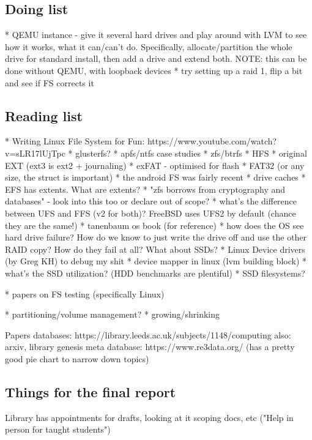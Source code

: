 \documentclass[a4paper]{report}
\begin{document}
    \subsection{Doing list}
        * QEMU instance
            - give it several hard drives and play around with LVM to see how
            it works, what it can/can't do. Specifically, allocate/partition
            the whole drive for standard install, then add a drive and extend
            both. NOTE: this can be done without QEMU, with loopback devices
        * try setting up a raid 1, flip a bit and see if FS corrects it

    \subsection{Reading list}
        * Writing Linux File System for Fun: https://www.youtube.com/watch?v=sLR17lUjTpc
        * glusterfs?
        * apfs/ntfs case studies
        * zfs/btrfs
        * HFS
        * original EXT (ext3 is ext2 + journaling)
        * exFAT - optimised for flash
        * FAT32 (or any size, the struct is important)
        * the android FS was fairly recent
        * drive caches
        * EFS has extents. What are extents?
        * "zfs borrows from cryptography and databases" - look into this too or declare out of scope?
        * what's the difference between UFS and FFS (v2 for both)? FreeBSD uses UFS2 by default (chance they are the same!)
        * tanenbaum os book (for reference)
        * how does the OS see hard drive failure? How do we know to just write the drive off and use the other RAID copy?
          How do they fail at all? What about SSDs?
        * Linux Device drivers (by Greg KH) to debug my shit
        * device mapper in linux (lvm building block)
        * what's the SSD utilization? (HDD benchmarks are plentiful)
        * SSD filesystems?

        * papers on FS testing (specifically Linux)

        * partitioning/volume management?
        * growing/shrinking

        Papers databases: https://library.leeds.ac.uk/subjects/1148/computing
        also: arxiv, library genesis
        meta database: https://www.re3data.org/ (has a pretty good pie chart to narrow down topics)

    \subsection{Things for the final report}
        Library has appointments for drafts, looking at it scoping docs, etc ("Help in person for taught students")
\end{document}
